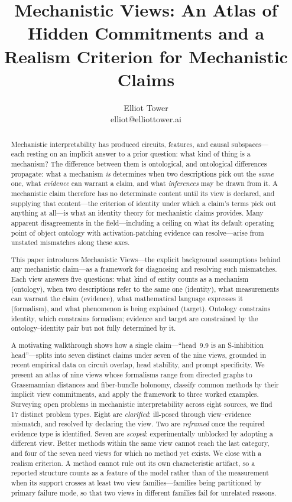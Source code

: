 \documentclass{article}
\title{Mechanistic Views: An Atlas of Hidden Commitments and a Realism Criterion for Mechanistic Claims}
\author{\name Elliot Tower \\
      \email elliot@elliottower.ai}
\begin{document}
\maketitle

\begin{abstract}
Mechanistic interpretability has produced circuits, features, and causal
subspaces---each resting on an implicit answer to a prior question:
what kind of thing is a mechanism?
The difference between them is ontological, and ontological differences
propagate: what a mechanism \emph{is} determines
when two descriptions pick out the \emph{same} one, what \emph{evidence}
can warrant a claim, and what \emph{inferences} may be drawn from it.
A mechanistic claim therefore has no determinate content until its view is
declared, and supplying that content---the criterion of identity under
which a claim's terms pick out anything at all---is what an identity
theory for mechanistic claims provides.
Many apparent disagreements in the field---including a ceiling on what
its default operating point of object ontology with activation-patching
evidence can resolve---arise from unstated mismatches along these axes.

This paper introduces Mechanistic Views---the explicit
background assumptions behind any mechanistic claim---as a framework
for diagnosing and resolving such mismatches.  Each view answers five
questions: what kind of entity counts as a mechanism (ontology), when
two descriptions refer to the same one (identity), what measurements
can warrant the claim (evidence), what mathematical language expresses
it (formalism), and what phenomenon is being explained (target).
Ontology constrains identity, which constrains formalism; evidence and
target are constrained by the ontology--identity pair but not fully
determined by it.

A motivating walkthrough shows how a single claim---``head~9.9
is an S-inhibition head''---splits into seven distinct claims under
seven of the nine views, grounded in recent empirical data on circuit
overlap,
head stability, and prompt specificity.
We present an atlas of nine views whose formalisms range from directed
graphs to Grassmannian distances and fiber-bundle holonomy, classify
common methods by their implicit view commitments, and apply the
framework to three worked examples.  Surveying open problems in
mechanistic interpretability across eight sources, we find 17 distinct
problem types.  Eight are \emph{clarified}: ill-posed through
view--evidence mismatch, and resolved by declaring the view.  Two are
\emph{reframed} once the required evidence type is identified.  Seven are
\emph{scoped}: experimentally unblocked by adopting a different view.
Better methods within the same view cannot reach the last category, and
four of the seven need views for which no method yet exists.
We close with a realism criterion.  A method cannot rule out its own
characteristic artifact, so a reported structure counts as a feature of
the model rather than of the measurement when its support crosses at
least two view families---families being partitioned by primary failure
mode, so that two views in different families fail for unrelated reasons.
\end{abstract}
\end{document}
